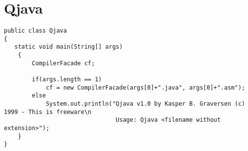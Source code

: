 \chapter{Qjava}
\label{a:qjava}
\OverviewLineNoTitle
\begin{footnotesize}\begin{verbatim}
public class Qjava
{
   static void main(String[] args)
    {
        CompilerFacade cf;
        
        if(args.length == 1)
            cf = new CompilerFacade(args[0]+".java", args[0]+".asm");
        else    
            System.out.println("Qjava v1.0 by Kasper B. Graversen (c) 1999 - This is freeware\n
                                Usage: Qjava <filename without extension>");
    }
}
\end{verbatim}\end{footnotesize}